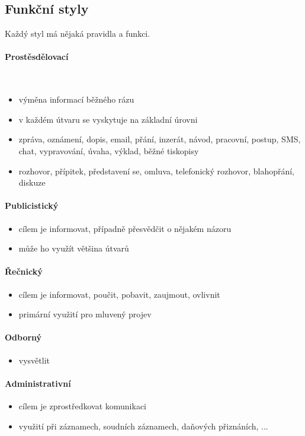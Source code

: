 \subsection{Funkční styly}
Každý styl má nějaká pravidla a funkci.
\paragraph{Prostěsdělovací}\mbox{}\\
\begin{itemize}
\item výměna informací běžného rázu
\item v každém útvaru se vyskytuje na základní úrovni
\item zpráva, oznámení, dopis, email, přání, inzerát, návod, pracovní, postup, SMS, chat, vypravování, úvaha, výklad, běžné tiskopisy
\item rozhovor, přípitek, představení se, omluva, telefonický rozhovor, blahopřání, diskuze
\end{itemize}

\paragraph{Publicistický}
\begin{itemize}
\item cílem je informovat, případně přesvědčit o nějakém názoru
\item může ho využít většina útvarů
\end{itemize}

\paragraph{Řečnický}
\begin{itemize}
\item cílem je informovat, poučit, pobavit, zaujmout, ovlivnit
\item primární využití pro mluvený projev
\end{itemize}

\paragraph{Odborný}
\begin{itemize}
\item vysvětlit
\end{itemize}

\paragraph{Administrativní}
\begin{itemize}
\item cílem je zprostředkovat komunikaci
\item využití při záznamech, soudních záznamech, daňových přiznáních, ...
\end{itemize}

